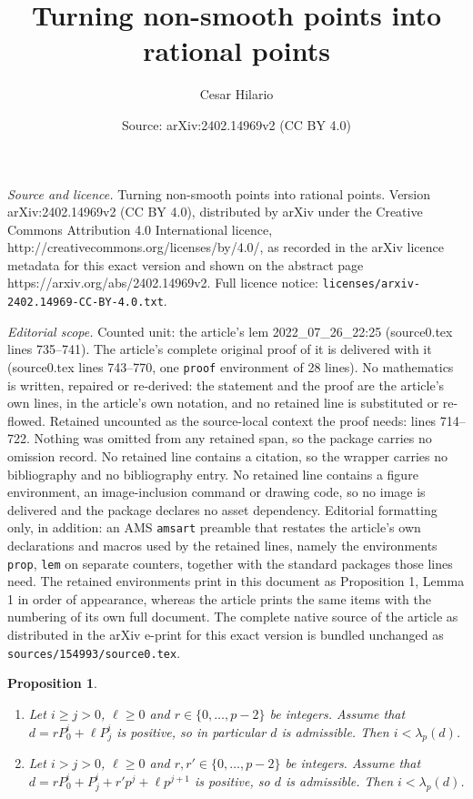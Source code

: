 \documentclass[10pt,a4paper]{amsart}
\title{Turning non-smooth points into rational points}
\author{Cesar Hilario}
\date{Source: arXiv:2402.14969v2 (CC BY 4.0)}
\newtheorem{prop}{Proposition}
\newcommand{\lam}{\lambda}
\begin{document}
\maketitle

\noindent\emph{Source and licence.} Turning non-smooth points into rational points. Version arXiv:2402.14969v2 (CC BY 4.0), distributed by arXiv under the Creative Commons Attribution 4.0 International licence, http://creativecommons.org/licenses/by/4.0/, as recorded in the arXiv licence metadata for this exact version and shown on the abstract page https://arxiv.org/abs/2402.14969v2. Full licence notice: \texttt{licenses/arxiv-2402.14969-CC-BY-4.0.txt}.\par\smallskip

\noindent\textit{Editorial scope.} Counted unit: the article's lem 2022\_07\_26\_22:25 (source0.tex lines 735--741). The article's complete original proof of it is delivered with it (source0.tex lines 743--770, one \texttt{proof} environment of 28 lines). No mathematics is written, repaired or re-derived: the statement and the proof are the article's own lines, in the article's own notation, and no retained line is substituted or re-flowed.  Retained uncounted as the source-local context the proof needs: lines 714--722.  Nothing was omitted from any retained span, so the package carries no omission record.  No retained line contains a citation, so the wrapper carries no bibliography and no bibliography entry.  No retained line contains a figure environment, an image-inclusion command or drawing code, so no image is delivered and the package declares no asset dependency.  Editorial formatting only, in addition: an AMS \texttt{amsart} preamble that restates the article's own declarations and macros used by the retained lines, namely the environments \texttt{prop}, \texttt{lem} on separate counters, together with the standard packages those lines need.  The retained environments print in this document as Proposition 1, Lemma 1 in order of appearance, whereas the article prints the same items with the numbering of its own full document.  The complete native source of the article as distributed in the arXiv e-print for this exact version is bundled unchanged as \texttt{sources/154993/source0.tex}.
\begin{prop}\label{2025_12_10_12:40}
$ $
\begin{enumerate}[\upshape (i)]
    \item \label{2025_12_10_12:41}
    Let $i\geq j>0$, $\ell\geq 0$ and $r\in\{0,\dots,p-2\}$ be integers. Assume that $d = r P_0^i + \ell P_j^i$ is positive, so in particular $d$ is admissible. Then $i<\lam_p(d)$.
    \item \label{2025_12_10_12:42}
    Let $i > j>0$, $\ell\geq 0$ and $r,r'\in\{0,\dots,p-2\}$ be integers. Assume that     $d = r P_0^i + P_j^i + r' p^j + \ell p^{j+1}$ is positive, so $d$ is admissible. Then $i<\lam_p(d)$.
\end{enumerate}
\end{prop}
\end{document}
